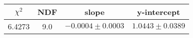 \begin{tabular}{|c|c|c|c|}

\hline
$\chi^{2}$ & NDF & slope & y-intercept  \\
\hline
6.4273 & 9.0 & $-0.0004\pm0.0003$ & $1.0443\pm0.0389$ \\
\hline

\end{tabular}